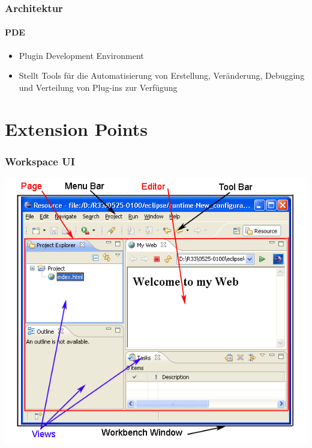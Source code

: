 {\begin{frame}
	\frametitle{Architektur}
	\framesubtitle{PDE}
	\begin{itemize}
		\item Plugin Development Environment 
		\item Stellt Tools für die Automatisierung von Erstellung, Veränderung, Debugging und Verteilung von Plug-ins zur Verfügung
	\end{itemize}
\end{frame}

\section{Extension Points}
\begin{frame}
  \frametitle{Workspace UI}
  \includegraphics[scale=0.4]{images/workspace-ui.png}
\end{frame}

}
